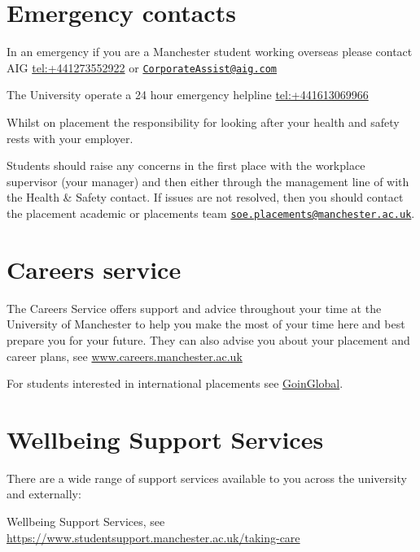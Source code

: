 \documentclass[
]{book}
\begin{document}
\section{Emergency contacts}\label{emergency}

In an emergency if you are a Manchester student working overseas please contact AIG \url{tel:+441273552922} or \href{mailto:CorporateAssist@aig.com}{\nolinkurl{CorporateAssist@aig.com}}

The University operate a 24 hour emergency helpline \url{tel:+441613069966}

Whilst on placement the responsibility for looking after your health and safety rests with your employer.

Students should raise any concerns in the first place with the workplace supervisor (your manager) and then either through the management line of with the Health \& Safety contact. If issues are not resolved, then you should contact the placement academic or placements team \href{mailto:soe.placements@manchester.ac.uk}{\nolinkurl{soe.placements@manchester.ac.uk}}.

\section{Careers service}\label{careers}

The Careers Service offers support and advice throughout your time at the University of Manchester to help you make the most of your time here and best prepare you for your future. They can also advise you about your placement and career plans, see \href{https://www.careers.manchester.ac.uk/}{www.careers.manchester.ac.uk} \citep{careers}

For students interested in international placements see \href{https://www.careers.manchester.ac.uk/international/goinglobal/}{GoinGlobal}. \citep{goinglobal}

\section{Wellbeing Support Services}\label{wellbeing}

There are a wide range of support services available to you across the university and externally:

Wellbeing Support Services, see \href{https://www.studentsupport.manchester.ac.uk/taking-care/}{https://www.studentsupport.manchester.ac.uk/taking-care} \citep{wellbeing}
\end{document}
